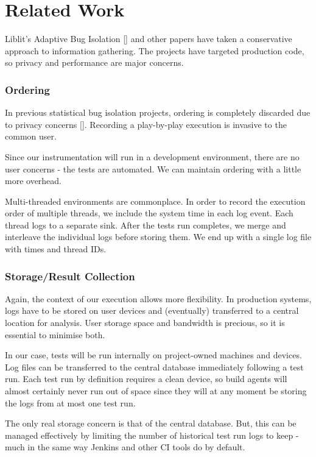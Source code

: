 \section{Related Work}
\label{sec:relwork}

Liblit’s Adaptive Bug Isolation [] and other papers have taken a conservative
approach to information gathering. The projects have targeted production code,
so privacy and performance are major concerns.


\subsubsection{Ordering}

In previous statistical bug isolation projects, ordering is completely discarded
due to privacy concerns []. Recording a play-by-play execution is invasive to
the common user.

Since our instrumentation will run in a development environment, there are no
user concerns - the tests are automated. We can maintain ordering with a little
more overhead.

Multi-threaded environments are commonplace. In order to record the execution
order of multiple threads, we include the system time in each log event. Each
thread logs to a separate sink. After the tests run completes, we merge and
interleave the individual logs before storing them. We end up with a single log
file with times and thread IDs.

\subsubsection{Storage/Result Collection}

Again, the context of our execution allows more flexibility. In production
systems, logs have to be stored on user devices and (eventually) transferred to
a central location for analysis. User storage space and bandwidth is precious,
so it is essential to minimise both.

In our case, tests will be run internally on project-owned machines and devices.
Log files can be transferred to the central database immediately following a
test run. Each test run by definition requires a clean device, so build agents
will almost certainly never run out of space since they will at any moment be
storing the logs from at most one test run.

The only real storage concern is that of the central database. But, this can be
managed effectively by limiting the number of historical test run logs to keep -
much in the same way Jenkins and other CI tools do by default.


